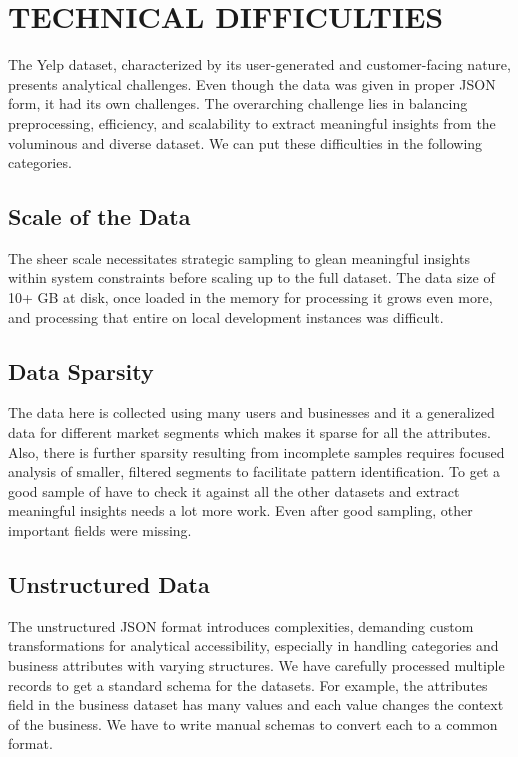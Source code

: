 \documentclass[conference]{IEEEtran}
\begin{document}


\section{TECHNICAL DIFFICULTIES}
The Yelp dataset, characterized by its user-generated and customer-facing nature, presents analytical challenges. Even though the data was given in proper JSON form, it had its own challenges. The overarching challenge lies in balancing preprocessing, efficiency, and scalability to extract meaningful insights from the voluminous and diverse dataset. We can put these difficulties in the following categories. 




\subsection{Scale of the Data}
The sheer scale necessitates strategic sampling to glean meaningful insights within system constraints before scaling up to the full dataset. The data size of 10+ GB at disk, once loaded in the memory for processing it grows even more, and processing that entire on local development instances was difficult. 
    
\subsection{Data Sparsity}  
The data here is collected using many users and businesses and it a generalized data for different market segments which makes it sparse for all the attributes. Also, there is further sparsity resulting from incomplete samples requires focused analysis of smaller, filtered segments to facilitate pattern identification. To get a good sample of have to check it against all the other datasets and extract meaningful insights needs a lot more work. Even after good sampling, other important fields were missing. 

\subsection{Unstructured Data} 
The unstructured JSON format introduces complexities, demanding custom transformations for analytical accessibility, especially in handling categories and business attributes with varying structures. We have carefully processed multiple records to get a standard schema for the datasets. For example, the attributes field in the business dataset has many values and each value changes the context of the business. We have to write manual schemas to convert each to a common format.
\end{document}

